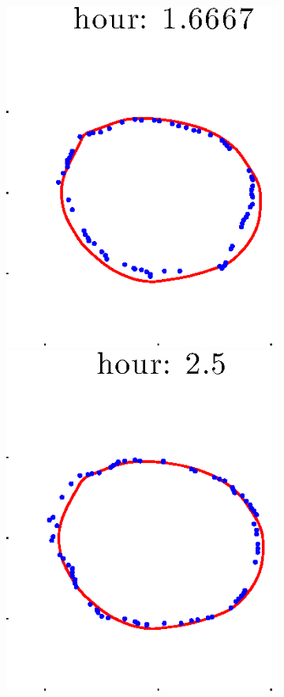 \documentclass[12pt]{article}
\begin{document}
\begin{figure}[h!]
\begin{subfigure}[b]{.3\textwidth}
		\includegraphics[height=.15\textheight]{Pos10exp2/secondhalf/second3.eps}
		\includegraphics[height=.15\textheight]{Pos10exp2/secondhalf/second4.eps}

\end{subfigure}
\end{figure}
\end{document}
